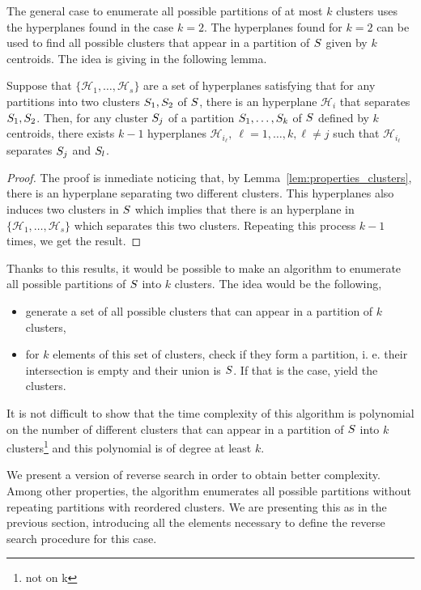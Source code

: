 \documentclass{article}
\newcommand{\cH}{\mathcal{H}}
\begin{document}
The general case to enumerate all possible partitions of at most $k$
clusters uses the hyperplanes found  in the case $k=2$. 
The hyperplanes found for $k=2$ can be used to find all possible
clusters that appear in a partition of $S$ given by $k$ centroids.
The idea is giving in the following lemma.
\begin{lemma}
  \label{lem:k-1-hyperplanes}
  Suppose that $\{\cH_1,\ldots, \cH_s\}$ are a set of hyperplanes
  satisfying that for any partitions  into two clusters
  $S_1,S_2$ of $S$, there is an hyperplane $\cH_i$ that
  separates $S_1,S_2$. Then, for any cluster $S_j$ of a
  partition $S_1,\ldots, S_{k}$ of $S$ defined by $k$
  centroids, there exists $k-1$ hyperplanes $\cH_{i_\ell},\ \ell = 1,\ldots,
  k, \ell\neq j$ such that $\cH_{i_{\ell}}$ separates $S_{j}$ and
  $S_{l}$. 
\end{lemma}
\begin{proof}
  The proof is inmediate noticing that, by
  Lemma~\ref{lem:properties_clusters}, there is an hyperplane
  separating two different clusters. This hyperplanes also induces two
  clusters in  $S$ which implies that there is an hyperplane in
  $\{\cH_1,\ldots, \cH_s\}$ which separates this two
  clusters. Repeating this process $k-1$ times, we get the result.
\end{proof}
Thanks to this results, it would be possible to make an algorithm to
enumerate all possible partitions of $S$ into $k$ clusters. The
idea would be the following,
\begin{itemize}
\item generate a set of all possible clusters that can appear
  in a partition of $k$ clusters,
\item for  $k$ elements of this set of clusters, check if they form a
  partition, i. e. their intersection is empty and their union is
  $S$. If that is the case, yield the clusters. 
\end{itemize}
It is not difficult to show that the time complexity of this algorithm
is polynomial on the number of different clusters that can appear
in a partition of $S$ into $k$ clusters\footnote{not on k} and this
polynomial is of degree at least $k$. 

We present a version of reverse search in order to obtain better
complexity. 
Among other properties, the algorithm enumerates all possible
partitions without repeating partitions with reordered clusters.
We are presenting this as in the previous section,
introducing all the elements necessary to define the reverse search
procedure for this case. 
\end{document}
